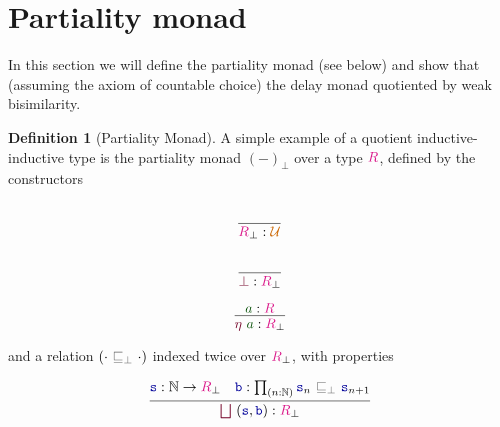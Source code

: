 \documentclass[twoside,11pt,openright]{report}
\theoremstyle{plain} %
\theoremstyle{definition}
\newtheorem{defn}[thm]{Definition}%
\theoremstyle{remark}
\newcommand*{\term}[1]{\textcolor{green!30!black}{#1}} %
\newcommand*{\type}[1]{\textcolor{magenta!90!black}{#1}}
\newcommand*{\universe}[1]{\textcolor{orange!80!black}{#1}}
\newcommand*{\relation}[1]{\textcolor{gray!75!black}{\ensuremath{\mathtt{#1}}}}
\newcommand*{\function}[1]{\textcolor{blue!60!black}{\ensuremath{\mathtt{#1}}}}
\newcommand*{\constructor}[1]{\textcolor{purple!60!black}{\ensuremath{\mathtt{#1}}}}
\begin{document}
\section{Partiality monad}
In this section we will define the partiality monad (see below) and show that (assuming the axiom of countable choice) the delay monad quotiented by weak bisimilarity.
\begin{defn}[Partiality Monad]
  A simple example of a quotient inductive-inductive type is the partiality monad \((-)_\bot\) over a type \(\type{R}\), defined by the constructors\\[-9mm]
  \begin{center}
    \begin{minipage}{0.25\linewidth}
      \begin{equation}
        \vcenter{\infer{\type{R}_\bot : \universe{\mathcal{U}}}{\strut}}
      \end{equation}
    \end{minipage}
    \hfill
    \begin{minipage}{0.25\linewidth}
      \begin{equation}
        \vcenter{\infer{\constructor{\bot} : \type{R}_\bot}{\strut}}
      \end{equation}
    \end{minipage}
    \hfill
    \begin{minipage}{0.25\linewidth}
      \begin{equation}
        \vcenter{\infer{\constructor{\eta}~\term{a} : \type{R}_\bot}{\term{a} : \type{R}}}
      \end{equation}
    \end{minipage}
  \end{center}
  and a relation \((\cdot~\relation{\sqsubseteq_{\bot}}~\cdot)\) indexed twice over \(\type{R}_\bot\), with properties\\[-9mm] 
  \begin{center}
    \begin{minipage}{0.45\linewidth}
      \begin{equation}
        \vcenter{\infer{\constructor{\bigsqcup}~(\function{s},\function{b}) : \type{R}_\bot}{\function{s} : \mathbb{N} \rightarrow \type{R}_\bot & \function{b} : \prod_{(n : \mathbb{N})} \function{s}_n~\relation{\sqsubseteq_{\bot}}~\function{s}_{n+1} }}
      \end{equation}
    \end{minipage}

\end{center}
\end{defn}
\end{document}
